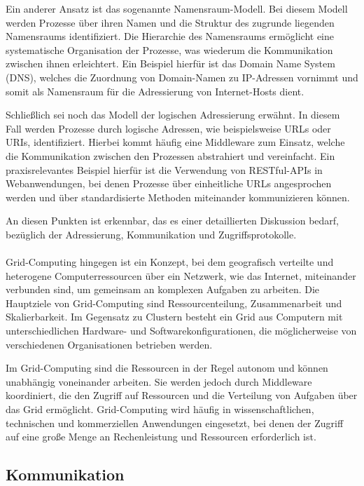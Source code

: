 \documentclass[../vs-script-first-v01.tex]{subfiles}
\begin{document}
Ein anderer Ansatz ist das sogenannte Namensraum-Modell. Bei diesem Modell werden Prozesse über ihren Namen und die Struktur des zugrunde liegenden Namensraums identifiziert. Die Hierarchie des Namensraums ermöglicht eine systematische Organisation der Prozesse, was wiederum die Kommunikation zwischen ihnen erleichtert. Ein Beispiel hierfür ist das Domain Name System (DNS), welches die Zuordnung von Domain-Namen zu IP-Adressen vornimmt und somit als Namensraum für die Adressierung von Internet-Hosts dient.

Schließlich sei noch das Modell der logischen Adressierung erwähnt. In diesem Fall werden Prozesse durch logische Adressen, wie beispielsweise URLs oder URIs, identifiziert. Hierbei kommt häufig eine Middleware zum Einsatz, welche die Kommunikation zwischen den Prozessen abstrahiert und vereinfacht. Ein praxisrelevantes Beispiel hierfür ist die Verwendung von RESTful-APIs in Webanwendungen, bei denen Prozesse über einheitliche URLs angesprochen werden und über standardisierte Methoden miteinander kommunizieren können.

An diesen Punkten ist erkennbar, das es einer detaillierten Diskussion bedarf, bezüglich der Adressierung, Kommunikation und Zugriffsprotokolle.
\\\\
Grid-Computing hingegen ist ein Konzept, bei dem geografisch verteilte und heterogene Computerressourcen über ein Netzwerk, wie das Internet, miteinander verbunden sind, um gemeinsam an komplexen Aufgaben zu arbeiten. Die Hauptziele von Grid-Computing sind Ressourcenteilung, Zusammenarbeit und Skalierbarkeit. Im Gegensatz zu Clustern besteht ein Grid aus Computern mit unterschiedlichen Hardware- und Softwarekonfigurationen, die möglicherweise von verschiedenen Organisationen betrieben werden.

Im Grid-Computing sind die Ressourcen in der Regel autonom und können unabhängig voneinander arbeiten. Sie werden jedoch durch Middleware koordiniert, die den Zugriff auf Ressourcen und die Verteilung von Aufgaben über das Grid ermöglicht. Grid-Computing wird häufig in wissenschaftlichen, technischen und kommerziellen Anwendungen eingesetzt, bei denen der Zugriff auf eine große Menge an Rechenleistung und Ressourcen erforderlich ist.

\label{Woche07}

\newpage
\subsection{Kommunikation}
\end{document}
